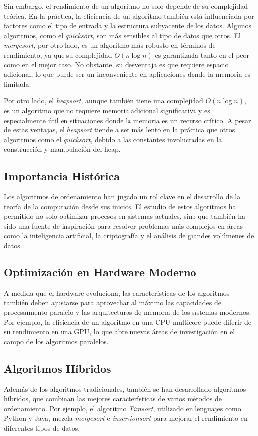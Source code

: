Sin embargo, el rendimiento de un algoritmo no solo depende de su complejidad teórica. En la práctica, la eficiencia de un algoritmo también está influenciada por factores como el tipo de entrada y la estructura subyacente de los datos. Algunos algoritmos, como el \textit{quicksort}, son más sensibles al tipo de datos que otros. El \textit{mergesort}, por otro lado, es un algoritmo más robusto en términos de rendimiento, ya que su complejidad \(O(n \log n)\) es garantizada tanto en el peor como en el mejor caso. No obstante, su desventaja es que requiere espacio adicional, lo que puede ser un inconveniente en aplicaciones donde la memoria es limitada.

Por otro lado, el \textit{heapsort}, aunque también tiene una complejidad \(O(n \log n)\), es un algoritmo que no requiere memoria adicional significativa y es especialmente útil en situaciones donde la memoria es un recurso crítico. A pesar de estas ventajas, el \textit{heapsort} tiende a ser más lento en la práctica que otros algoritmos como el \textit{quicksort}, debido a las constantes involucradas en la construcción y manipulación del heap.

\subsection{Importancia Histórica}
Los algoritmos de ordenamiento han jugado un rol clave en el desarrollo de la teoría de la computación desde sus inicios. El estudio de estos algoritmos ha permitido no solo optimizar procesos en sistemas actuales, sino que también ha sido una fuente de inspiración para resolver problemas más complejos en áreas como la inteligencia artificial, la criptografía y el análisis de grandes volúmenes de datos.

\subsection{Optimización en Hardware Moderno}
A medida que el hardware evoluciona, las características de los algoritmos también deben ajustarse para aprovechar al máximo las capacidades de procesamiento paralelo y las arquitecturas de memoria de los sistemas modernos. Por ejemplo, la eficiencia de un algoritmo en una CPU multicore puede diferir de su rendimiento en una GPU, lo que abre nuevas áreas de investigación en el campo de los algoritmos paralelos.

\subsection{Algoritmos Híbridos}
Además de los algoritmos tradicionales, también se han desarrollado algoritmos híbridos, que combinan las mejores características de varios métodos de ordenamiento. Por ejemplo, el algoritmo \textit{Timsort}, utilizado en lenguajes como Python y Java, mezcla \textit{mergesort} e \textit{insertionsort} para mejorar el rendimiento en diferentes tipos de datos.

